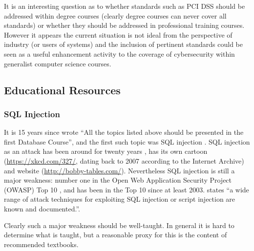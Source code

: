 \documentclass[conference]{IEEEtran}
\begin{document}
It is an interesting question as to whether standards such as PCI DSS should be addressed within degree courses (clearly degree courses can never cover all standards) or whether they should be addressed in professional training courses. However it appears the current situation is not ideal from the perspective of industry (or users of systems) and the inclusion of pertinent standards could be seen as a useful enhancement activity to the coverage of cybersecurity within generalist %
computer science courses.

\subsection{Educational Resources}\label{sec:EDResource}

\subsubsection{SQL Injection}\label{sec:SQL}

It is 15 years since \cite{Guimaraesetal2004} 
wrote ``All the topics listed above should be presented in the first
Database Course'', and the first such topic was SQL injection \cite{SPIDynamics2002,Anonymous2018b}. SQL injection as an attack has been around for twenty years \cite{HornerHyslip2017a}, has its own cartoon (\url{https://xkcd.com/327/}, dating back to 2007 according to the Internet Archive) and website (\url{http://bobby-tables.com/}). Nevertheless SQL injection is still a major weakness: number one in the Open Web Application Security Project (OWASP) Top 10 \cite{OWASP2017a}, and has been in the Top 10 since at least 2003.  \cite[the UK's definitive reference]{Bristol2018a} states ``a wide range of attack techniques for exploiting SQL
injection or script injection are known and documented.''.

Clearly such a major weakness should be well-taught.  In general it is hard to determine what is taught, but a reasonable proxy for this is the content of recommended textbooks. 
\end{document}
